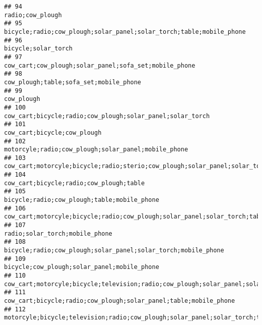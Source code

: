 \documentclass[
]{article}
\begin{document}
\begin{verbatim}
## 94                                                                                                                          radio;cow_plough
## 95                                                                       bicycle;radio;cow_plough;solar_panel;solar_torch;table;mobile_phone
## 96                                                                                                                       bicycle;solar_torch
## 97                                                                                     cow_cart;cow_plough;solar_panel;sofa_set;mobile_phone
## 98                                                                                                    cow_plough;table;sofa_set;mobile_phone
## 99                                                                                                                                cow_plough
## 100                                                                                cow_cart;bicycle;radio;cow_plough;solar_panel;solar_torch
## 101                                                                                                              cow_cart;bicycle;cow_plough
## 102                                                                                      motorcyle;radio;cow_plough;solar_panel;mobile_phone
## 103                                            cow_cart;motorcyle;bicycle;radio;sterio;cow_plough;solar_panel;solar_torch;table;mobile_phone
## 104                                                                                                  cow_cart;bicycle;radio;cow_plough;table
## 105                                                                                              bicycle;radio;cow_plough;table;mobile_phone
## 106                                                   cow_cart;motorcyle;bicycle;radio;cow_plough;solar_panel;solar_torch;table;mobile_phone
## 107                                                                                                           radio;solar_torch;mobile_phone
## 108                                                                            bicycle;radio;cow_plough;solar_panel;solar_torch;mobile_phone
## 109                                                                                              bicycle;cow_plough;solar_panel;mobile_phone
## 110                                        cow_cart;motorcyle;bicycle;television;radio;cow_plough;solar_panel;solar_torch;table;mobile_phone
## 111                                                                         cow_cart;bicycle;radio;cow_plough;solar_panel;table;mobile_phone
## 112                                                 motorcyle;bicycle;television;radio;cow_plough;solar_panel;solar_torch;table;mobile_phone

\end{verbatim}
\end{document}
